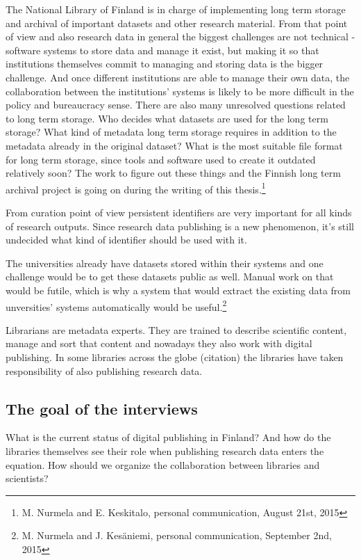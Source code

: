The National Library of Finland is in charge of implementing long term storage
and archival of important datasets and other research material. From that point
of view and also research data in general the biggest challenges are not
technical - software systems to store data and manage it exist, but making it
so that institutions themselves commit to managing and storing data is the
bigger challenge. And once different institutions are able to manage their own
data, the collaboration between the institutions' systems is likely to be
more difficult in the policy and bureaucracy sense. There are also many
unresolved questions related to long term storage. Who decides what datasets
are used for the long term storage? What kind of metadata long term storage
requires in addition to the metadata already in the original dataset? What
is the most suitable file format for long term storage, since tools and
software used to create it outdated relatively soon? The work
to figure out these things and the Finnish long term archival project is going
on during the writing of this thesis.\footnote{\label{keskitalo}M. Nurmela and E. Keskitalo, personal communication, August 21st, 2015}

From curation point of view persistent identifiers are very important for
all kinds of research outputs. Since research data publishing is a new
phenomenon, it's still undecided what kind of identifier should be used
with it.

The universities already have datasets stored within their systems and one
challenge would be to get these datasets public as well. Manual work on that
would be futile, which is why a system that would extract the existing data
from unversities' systems automatically would be useful.\footnote{M. Nurmela
and J. Kesäniemi, personal communication, September 2nd, 2015}

\iffalse
Librarians are metadata experts. They are trained to describe scientific
content, manage and sort that content and nowadays they also work with digital
publishing. In some libraries across the globe (citation) the libraries have
taken responsibility of also publishing research data.

\subsection{The goal of the interviews}

What is the current status of digital publishing in Finland? And how do the
libraries themselves see their role when publishing research data enters the
equation. How should we organize the collaboration between libraries and
scientists?


